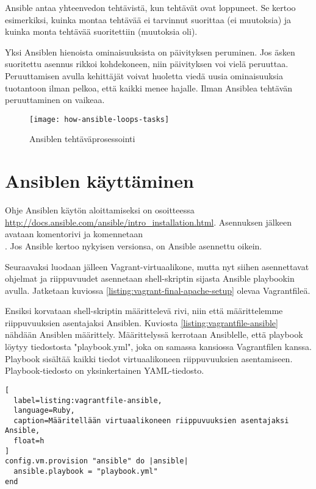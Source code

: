 Ansible antaa yhteenvedon tehtävistä, kun tehtävät ovat loppuneet. Se kertoo esimerkiksi, kuinka montaa tehtävää ei tarvinnut suorittaa (ei muutoksia) ja kuinka monta tehtävää suoritettiin (muutoksia oli).

Yksi Ansiblen hienoista ominaisuuksista on päivityksen peruminen. Jos äsken suoritettu asennus rikkoi kohdekoneen, niin päivityksen voi vielä peruuttaa. Peruuttamisen avulla kehittäjät voivat huoletta viedä uusia ominaisuuksia tuotantoon ilman pelkoa, että kaikki menee hajalle. Ilman Ansiblea tehtävän peruuttaminen on vaikeaa.

\begin{figure}[h]
  \centering
  \texttt{[image: how-ansible-loops-tasks]}
  \caption{Ansiblen tehtäväprosessointi}
  \label{fig:how-ansible-loops-tasks}
\end{figure}

\section{Ansiblen käyttäminen}

Ohje Ansiblen käytön aloittamiseksi on osoitteessa \url{http://docs.ansible.com/ansible/intro_installation.html}. Asennuksen jälkeen avataan komentorivi ja komennetaan \\ . Jos Ansible kertoo nykyisen versionsa, on Ansible asennettu oikein.

Seuraavaksi luodaan jälleen Vagrant-virtuaalikone, mutta nyt siihen asennettavat ohjelmat ja riippuvuudet asennetaan shell-skriptin sijasta Ansible playbookin avulla. Jatketaan kuviossa \ref{listing:vagrant-final-apache-setup} olevaa Vagrantfileä.

Ensiksi korvataan shell-skriptin määrittelevä rivi, niin että määrittelemme riippuvuuksien asentajaksi Ansiblen. Kuviosta \ref{listing:vagrantfile-ansible} nähdään Ansiblen määrittely. Määrittelyssä kerrotaan Ansiblelle, että playbook löytyy tiedostosta "playbook.yml", joka on samassa kansiossa Vagrantfilen kanssa. Playbook sisältää kaikki tiedot virtuaalikoneen riippuvuuksien asentamiseen. Playbook-tiedosto on yksinkertainen YAML-tiedosto.

\begin{lstlisting}[
  label=listing:vagrantfile-ansible,
  language=Ruby,
  caption=Määritellään virtuaalikoneen riippuvuuksien asentajaksi Ansible,
  float=h
]
config.vm.provision "ansible" do |ansible|
  ansible.playbook = "playbook.yml"
end
\end{lstlisting}

